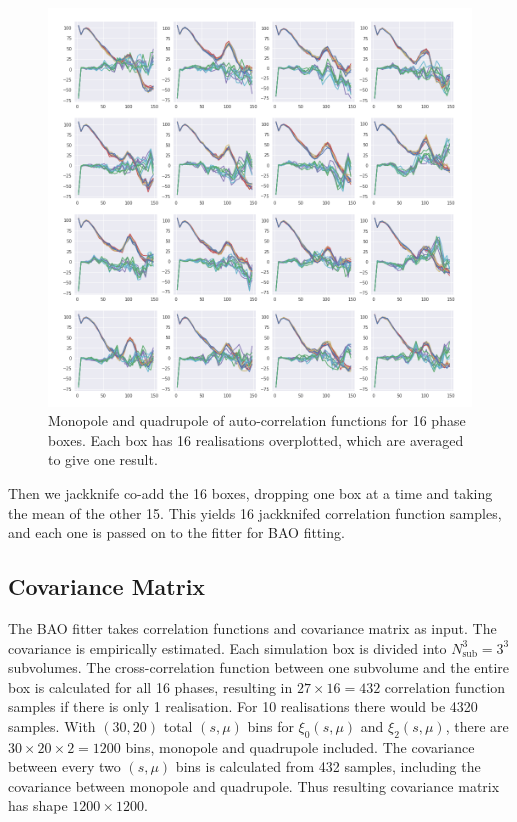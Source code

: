 \documentclass[fleqn,usenatbib]{mnras}
\begin{document}
		\begin{figure}
			\includegraphics[width=\linewidth]{xi_r10_phases_tinker13.png}
		    \caption{Monopole and quadrupole of auto-correlation functions for 16 phase boxes. Each box has 16 realisations overplotted, which are averaged to give one result.}
		    \label{fig:xi_r10_phases}
		\end{figure}
		
		Then we jackknife co-add the 16 boxes, dropping one box at a time and taking the mean of the other 15. This yields 16 jackknifed correlation function samples, and each one is passed on to the fitter for BAO fitting.

	\subsection{Covariance Matrix}
		
		The BAO fitter takes correlation functions and covariance matrix as input. The covariance is empirically estimated. Each simulation box is divided into $N_\text{sub}^3=3^3$ subvolumes. The cross-correlation function between one subvolume and the entire box is calculated for all 16 phases, resulting in $27 \times 16 = 432$ correlation function samples if there is only 1 realisation. For 10 realisations there would be 4320 samples. With $(30, 20)$ total $(s, \mu)$ bins for $\xi_0(s, \mu)$ and $\xi_2(s, \mu)$, there are $30\times 20 \times 2 = 1200$ bins, monopole and quadrupole included. The covariance between every two $(s,\mu)$ bins is calculated from 432 samples, including the covariance between monopole and quadrupole. Thus resulting covariance matrix has shape $1200\times 1200$.
		
\end{document}
